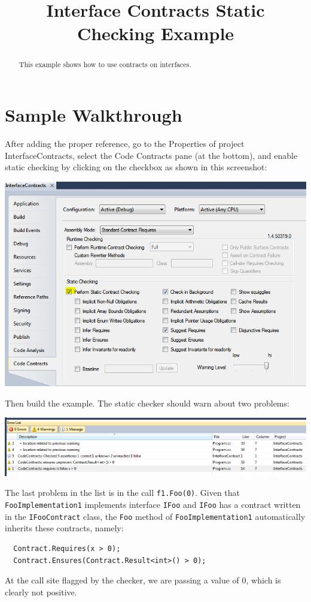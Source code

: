 \documentclass{article}
\title{Interface Contracts Static Checking Example}
\date{}
\newcommand{\code}[1]{\lstinline{#1}}
\newcommand{\ProjectName}{InterfaceContracts}
\begin{document}
\maketitle
\begin{abstract}
This example shows how to use contracts on interfaces.
\end{abstract}



\section{Sample Walkthrough}
\label{sec:start}

After adding the proper reference, go to the Properties of project
\textsf{\ProjectName}, select the Code Contracts pane (at the bottom), and enable static
checking by clicking on the checkbox as shown in this screenshot:
\begin{center}
  \includegraphics[width=.8\columnwidth]{ex1.png}
\end{center}

Then build the example. The static checker should warn about two
problems:
\begin{center}
  \includegraphics[width=1\columnwidth]{ex2.png}
\end{center}
The last problem in the list is in the call \code{f1.Foo(0)}. Given that
\code{FooImplementation1} implements interface \code{IFoo} and
\code{IFoo} has a contract written in the \code{IFooContract} class,
the \code{Foo} method of \code{FooImplementation1} automatically
inherits these contracts, namely:
\begin{lstlisting}
  Contract.Requires(x > 0);
  Contract.Ensures(Contract.Result<int>() > 0);
\end{lstlisting}
At the call site flagged by the checker, we are passing a value of 0,
which is clearly not positive.
\end{document}
